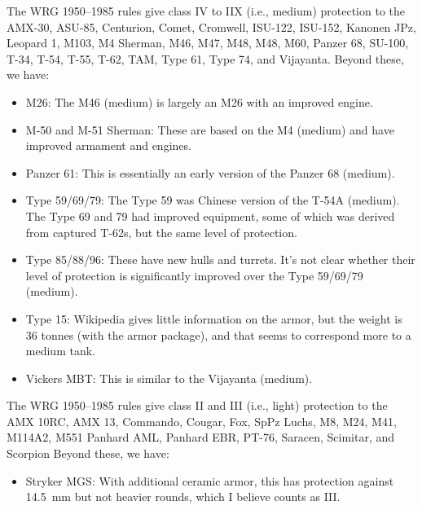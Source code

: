 {{\begin{itemize}
        \end{itemize}
        The WRG 1950--1985 rules give class IV to IIX (i.e., medium) protection to the
        AMX-30,
        ASU-85,
        Centurion,
        Comet,
        Cromwell,
        ISU-122,
        ISU-152,
        Kanonen JPz,
        Leopard 1,
        M103,
        M4 Sherman,
        M46,
        M47,
        M48,
        M48,
        M60,
        Panzer 68,
        SU-100,
        T-34,
        T-54,
        T-55,
        T-62,
        TAM,
        Type 61,
        Type 74, and
        Vijayanta.
        Beyond these, we have:
        \begin{itemize}
            \item M26: The M46 (medium) is largely an M26 with an improved engine.
            \item M-50 and M-51 Sherman: These are based on the M4 (medium) and have improved armament and engines.
            \item Panzer 61: This is essentially an early version of the Panzer 68 (medium).
            \item Type 59/69/79: The Type 59 was Chinese version of the T-54A (medium). The Type 69 and 79 had improved equipment, some of which was derived from captured T-62s, but the same level of protection.
            \item Type 85/88/96: These have new hulls and turrets. It's not clear whether their level of protection is significantly improved over the Type 59/69/79 (medium).
            \item Type 15: Wikipedia gives little information on the armor, but the weight is 36 tonnes (with the armor package), and that seems to correspond more to a medium tank.
            \item Vickers MBT: This is similar to the  Vijayanta (medium).
        \end{itemize}
        The WRG 1950--1985 rules give class II and III (i.e., light) protection to the
        AMX 10RC,
        AMX 13,
        Commando,
        Cougar,
        Fox,
        SpPz Luchs,
        M8,
        M24,
        M41,
        M114A2,
        M551
        Panhard AML,
        Panhard EBR,
        PT-76,
        Saracen,
        Scimitar, and
        Scorpion
        Beyond these, we have:
        \begin{itemize}
            \item Stryker MGS: With additional ceramic armor, this has protection against 14.5~mm but not heavier rounds, which I believe counts as III.

\end{itemize}}}
